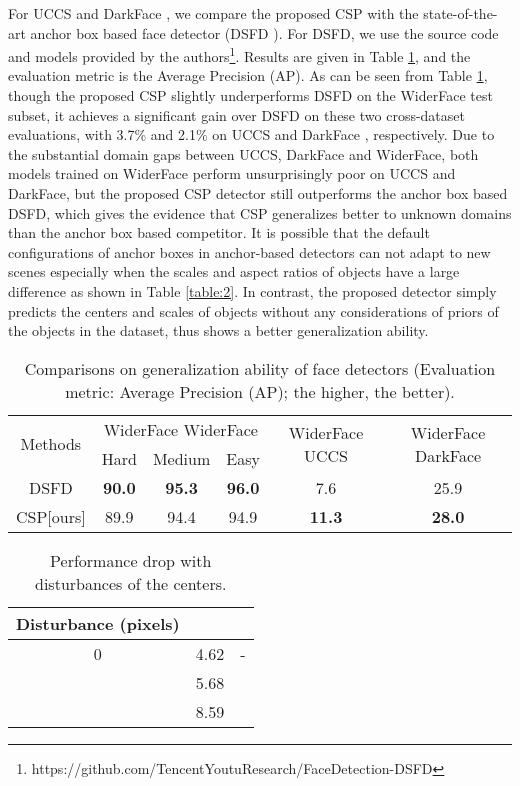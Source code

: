 For UCCS \cite{uccs} and DarkFace \cite{wei2018deep}, we compare the proposed CSP with the state-of-the-art anchor box based face detector (DSFD \cite{li2018dsfd}). For DSFD, we use the source code and models provided by the authors\footnote{https://github.com/TencentYoutuResearch/FaceDetection-DSFD}.
Results are given in Table \ref{table:3}, and the evaluation metric is the Average Precision (AP). As can be seen from Table \ref{table:3}, though the proposed CSP slightly underperforms DSFD on the WiderFace test subset, it achieves a significant gain over DSFD on these two cross-dataset evaluations, with 3.7\% and 2.1\% on UCCS \cite{uccs} and DarkFace \cite{wei2018deep}, respectively. Due to the substantial domain gaps between UCCS, DarkFace and WiderFace, both models trained on WiderFace perform unsurprisingly poor on UCCS and DarkFace, but the proposed CSP detector still outperforms the anchor box based DSFD, which gives the evidence that CSP generalizes better to unknown domains than the anchor box based competitor. It is possible that the default configurations of anchor boxes in anchor-based detectors can not adapt to new scenes especially when the scales and aspect ratios of objects have a large difference as shown in Table \ref{table:2}. In contrast, the proposed detector simply predicts the centers and scales of objects without any considerations of priors of the objects in the dataset, thus shows a better generalization ability.

\begin{table}
\begin{center}
\begin{tabular}{c|c|c|c|c|c}
\hline
\multirow{2}{*}{Methods} & \multicolumn{3}{c|}{WiderFace  WiderFace} & \multirow{2}{*}{WiderFace  UCCS} & \multirow{2}{*}{WiderFace  DarkFace}\\
\cline{2-4} {} & Hard & Medium & Easy & {} & {}\\
\hline
\hline
DSFD \cite{li2018dsfd} & \textbf{90.0} & \textbf{95.3} & \textbf{96.0} & 7.6 & 25.9\\
\hline
CSP[ours] & 89.9 & 94.4 & 94.9 & \textbf{11.3} & \textbf{28.0}\\
\hline
\end{tabular}
\end{center}
\caption{Comparisons on generalization ability of face detectors (Evaluation metric: Average Precision (AP); the higher, the better).}
\label{table:3}
\end{table}

\begin{table}
\begin{center}
\begin{tabular}{c|c|c}
\hline
Disturbance (pixels) &  & \\
\hline
\hline
0 & 4.62 & -\\
\hline
[0, 4] & 5.68& \\
\hline
[0, 8] & 8.59& \\
\hline
\end{tabular}
\end{center}
\caption{Performance drop with disturbances of the centers.}
\label{table:disturb}
\end{table}


